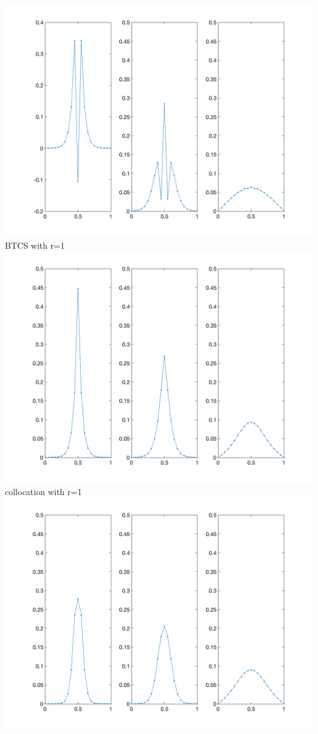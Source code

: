 \documentclass{article}
\begin{document}
\includegraphics[scale = 0.25]{CN_2.png}\\
BTCS with r=1\\
\includegraphics[scale = 0.25]{BTCS_1.png}\\
collocation with r=1\\
\includegraphics[scale = 0.25]{collocation_1.png}\\
\end{document}
